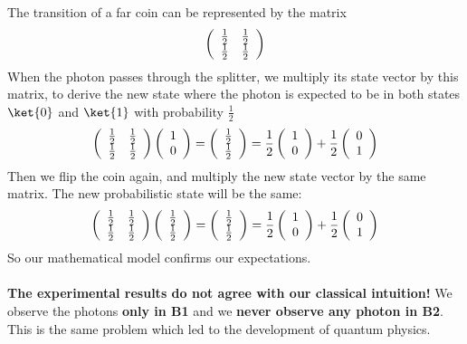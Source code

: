 \documentclass[10pt]{report}
\begin{document}
The transition of a far coin can be represented by the matrix $$\left(\begin{array}{c c}
\frac{1}{2}&\frac{1}{2}\\\frac{1}{2}&\frac{1}{2}
\end{array}\right)$$
When the photon passes through the splitter, we multiply its state vector by this matrix, to derive the new state where the photon is expected to be in both states $\ket{0}$ and $\ket{1}$ with probability $\frac{1}{2}$
$$\left(\begin{array}{c c}
\frac{1}{2}&\frac{1}{2}\\\frac{1}{2}&\frac{1}{2}
\end{array}\right)\left(\begin{array}{c}
1\\0
\end{array}\right) = \left(\begin{array}{c}
\frac{1}{2}\\\frac{1}{2}
\end{array}\right) = \frac{1}{2}\left(\begin{array}{c}
1\\0
\end{array}\right) + \frac{1}{2}\left(\begin{array}{c}
0\\1
\end{array}\right)$$
Then we flip the coin again, and multiply the new state vector by the same matrix. The new probabilistic state will be the same:
$$\left(\begin{array}{c c}
\frac{1}{2}&\frac{1}{2}\\\frac{1}{2}&\frac{1}{2}
\end{array}\right)\left(\begin{array}{c}
\frac{1}{2}\\\frac{1}{2}
\end{array}\right) = \left(\begin{array}{c}
\frac{1}{2}\\\frac{1}{2}
\end{array}\right) = \frac{1}{2}\left(\begin{array}{c}
1\\0
\end{array}\right) + \frac{1}{2}\left(\begin{array}{c}
0\\1
\end{array}\right)$$
So our mathematical model confirms our expectations.\\\\
\textbf{The experimental results do not agree with our classical intuition!} We observe the photons \textbf{only in B1} and we \textbf{never observe any photon in B2}. This is the same problem which led to the development of quantum physics.
\end{document}

